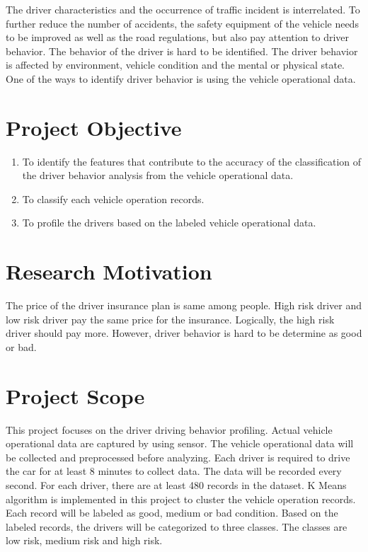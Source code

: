The driver characteristics and the occurrence of traffic incident is interrelated. To further reduce the number of accidents, the safety equipment of the vehicle needs to be improved as well as the road regulations, but also pay attention to driver behavior. The behavior of the driver is hard to be identified. The driver behavior is affected by environment, vehicle condition and the mental or physical state. One of the ways to identify driver behavior is using the vehicle operational data.

\section{Project Objective}
\begin{enumerate}
\item To identify the features that contribute to the accuracy of the classification of the driver behavior analysis from the vehicle operational data.
\item To classify each vehicle operation records.
\item To profile the drivers based on the labeled vehicle operational data.
\end{enumerate}

\section{Research Motivation}
The price of the driver insurance plan is same among people. High risk driver and low risk driver pay the same price for the insurance. Logically, the high risk driver should pay more. However, driver behavior is hard to be determine as good or bad. 

\section{Project Scope}
This project focuses on the driver driving behavior profiling. Actual vehicle operational data are captured by using sensor. The vehicle operational data will be collected and preprocessed before analyzing. Each driver is required to drive the car for at least 8 minutes to collect data. The data will be recorded every second. For each driver, there are at least 480 records in the dataset. K Means algorithm is implemented in this project to cluster the vehicle operation records. Each record will be labeled as good, medium or bad condition. Based on the labeled records, the drivers will be categorized to three classes. The classes are low risk, medium risk and high risk. 

